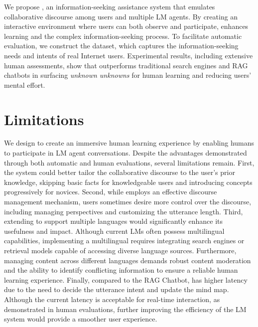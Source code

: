\documentclass[11pt]{article}
\begin{document}
We propose \system, an information-seeking assistance system that emulates collaborative discourse among users and multiple LM agents. By creating an interactive environment where users can both observe and participate, \system enhances learning and the complex information-seeking process. To facilitate automatic evaluation, we construct the \data dataset, which captures the information-seeking needs and intents of real Internet users. Experimental results, including extensive human assessments, show that \system outperforms traditional search engines and RAG chatbots in surfacing \textit{unknown unknowns} for human learning and reducing users' mental effort.%


\section*{Limitations}

We design \system to create an immersive human learning experience by enabling humans to participate in LM agent conversations. Despite the advantages demonstrated through both automatic and human evaluations, several limitations remain. First, the system could better tailor the collaborative discourse to the user’s prior knowledge, skipping basic facts for knowledgeable users and introducing concepts progressively for novices. Second, while \system employs an effective discourse management mechanism, users sometimes desire more control over the discourse, including managing \expert perspectives and customizing the utterance length. Third, extending \system to support multiple languages would significantly enhance its usefulness and impact. Although current LMs often possess multilingual capabilities, implementing a multilingual \system requires integrating search engines or retrieval models capable of accessing diverse language sources. Furthermore, managing content across different languages demands robust content moderation and the ability to identify conflicting information to ensure a reliable human learning experience. Finally, compared to the RAG Chatbot, \system has higher latency due to the need to decide the utterance intent and update the mind map. Although the current latency is acceptable for real-time interaction, as demonstrated in human evaluations, further improving the efficiency of the LM system would provide a smoother user experience.
\end{document}
